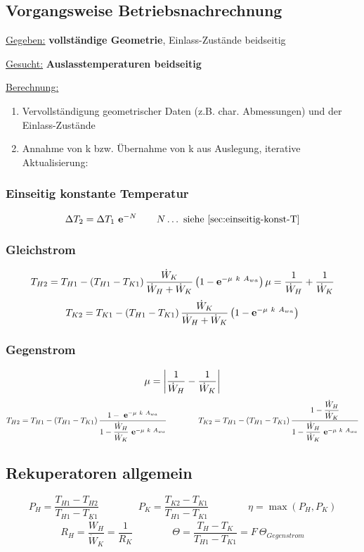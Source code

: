 \clearpage
\subsection{Vorgangsweise Betriebsnachrechnung}
	\underline{Gegeben:} \textbf{vollständige Geometrie}, Einlass-Zustände beidseitig

	\underline{Gesucht:} \textbf{Auslasstemperaturen beidseitig}

	\begin{singlespace}
		\underline{Berechnung:}
		\begin{enumerate}
			\item Vervollständigung geometrischer Daten (z.B. char. Abmessungen) und der Einlass-Zustände
			\item Annahme von k bzw. Übernahme von k aus Auslegung, iterative Aktualisierung:
		\end{enumerate}
	\end{singlespace}

\subsubsection{Einseitig konstante Temperatur }
	\[ \Delta T_2 = \Delta T_1\ \eul^{-N}   \qquad N\dots \text{ siehe \ref{sec:einseitig-konst-T}} \]

\subsubsection{Gleichstrom}
	\setlength{\abovedisplayshortskip}{-5pt}
	\[
		T_{H2} =  T_{H1} - (T_{H1} - T_{K1})\, \dfrac{\dot{W}_K}{\dot{W}_H + \dot{W}_K} \left(1- \eul^{-\mu\ k\ A_{wa}}\right)
		\hfil \mu = \dfrac{1}{\dot{W}_H} + \dfrac{1}{\dot{W}_K} \hfil
	\]
	\[
		T_{K2} =  T_{K1} - (T_{H1} - T_{K1})\, \dfrac{\dot{W}_K}{\dot{W}_H + \dot{W}_K} \left(1- \eul^{-\mu\ k\ A_{wa}}\right)
	\]

\subsubsection{Gegenstrom}
	\[
		\mu  = \left|\dfrac{1}{\dot{W}_H} - \dfrac{1}{\dot{W}_K}\right|
	\]
	\[
		 T_{H2} =  T_{H1} - (T_{H1} - T_{K1})\, \dfrac{1-\ \eul^{-\mu\ k\ A_{wa}}}  {1- \dfrac{\dot{W}_H}{\dot{W}_K}\ \eul^{-\mu\ k\ A_{wa}}}
		 \qquad\qquad
		 T_{K2}  =  {T_{H1}} - (T_{H1} - T_{K1})\, \dfrac{1- \dfrac{\dot{W}_H}{\dot{W}_K}}  {1- \dfrac{\dot{W}_H}{\dot{W}_K}\ \eul^{-\mu\ k\ A_{wa}}}
	\]

\subsection{Rekuperatoren allgemein}
	\[
		P_H = \dfrac{T_{H1} - T_{H2}}{T_{H1} - T_{K1}}
		\qquad\qquad
		P_K = \dfrac{T_{K2} - T_{K1}}{T_{H1} - T_{K1}}
		\qquad\qquad
		\eta = \max(P_H,P_K)
	 \]
	 \[
	 	R_H = \dfrac{\dot{W}_H}{\dot{W}_K} = \dfrac{1}{R_K}
	 	\qquad\qquad
	 	\varTheta = \dfrac{T_H - T_K}{T_{H1} - T_{K1}} = F\ \varTheta_{Gegenstrom}
	 \]

